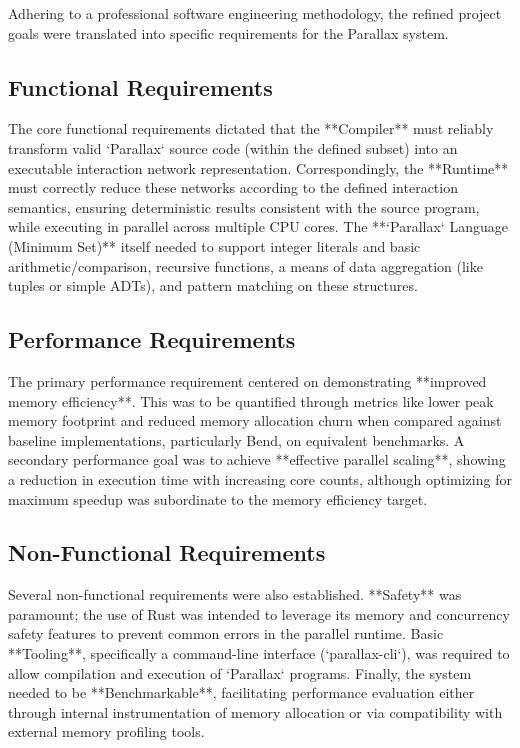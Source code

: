 Adhering to a professional software engineering methodology, the refined project goals were translated into specific requirements for the Parallax system.

\subsection{Functional Requirements} %
The core functional requirements dictated that the **Compiler** must reliably transform valid `Parallax` source code (within the defined subset) into an executable interaction network representation. Correspondingly, the **Runtime** must correctly reduce these networks according to the defined interaction semantics, ensuring deterministic results consistent with the source program, while executing in parallel across multiple CPU cores. The **`Parallax` Language (Minimum Set)** itself needed to support integer literals and basic arithmetic/comparison, recursive functions, a means of data aggregation (like tuples or simple ADTs), and pattern matching on these structures.

\subsection{Performance Requirements} %
The primary performance requirement centered on demonstrating **improved memory efficiency**. This was to be quantified through metrics like lower peak memory footprint and reduced memory allocation churn when compared against baseline implementations, particularly Bend, on equivalent benchmarks. A secondary performance goal was to achieve **effective parallel scaling**, showing a reduction in execution time with increasing core counts, although optimizing for maximum speedup was subordinate to the memory efficiency target.

\subsection{Non-Functional Requirements} %
Several non-functional requirements were also established. **Safety** was paramount; the use of Rust was intended to leverage its memory and concurrency safety features to prevent common errors in the parallel runtime. Basic **Tooling**, specifically a command-line interface (`parallax-cli`), was required to allow compilation and execution of `Parallax` programs. Finally, the system needed to be **Benchmarkable**, facilitating performance evaluation either through internal instrumentation of memory allocation or via compatibility with external memory profiling tools.

